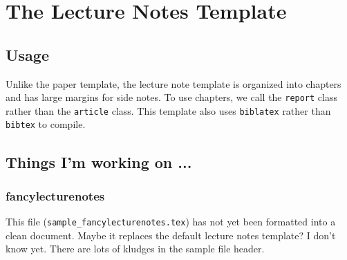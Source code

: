 \documentclass[12pt, oneside]{report}    %
\let\oldsection\section
\def\section{%
  \setcounter{sidenote}{1}%
  \oldsection
}
\begin{document}
\newpage
\renewcommand{\etocaftertochook}{}


\small
\setcounter{tocdepth}{2}
\tableofcontents
\normalsize
\clearpage
\restoregeometry        %




\etocsettocstyle{\footnotesize}{\normalsize}

  {\noindent}  %
  {\noindent}           %
  { 
    \makebox[.75cm][l]{\etocnumber}
    \etocname 
    \dotfill 
    \etocpage 
    \par}               %
  {}                    %





\chapter{The Lecture Notes Template}


\section{Usage}

Unlike the paper template, the lecture note template is organized into chapters and has large margins for side notes. To use chapters, we call the \texttt{report} class rather than the \texttt{article} class. This template also uses \texttt{biblatex} rather than \texttt{bibtex} to compile.


\section{Things I'm working on ...}

\subsection{fancylecturenotes}

This file (\verb!sample_fancylecturenotes.tex!) has not yet been formatted into a clean document. Maybe it replaces the default lecture notes template? I don't know yet. There are lots of kludges in the sample file header.
\end{document}
